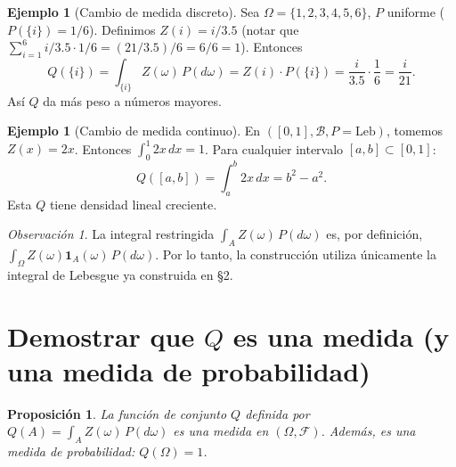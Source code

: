 \documentclass[11pt,a4paper]{article}
\theoremstyle{plain}
\newtheorem{proposition}[theorem]{Proposición}
\theoremstyle{definition}
\newtheorem{example}[theorem]{Ejemplo}
\theoremstyle{remark}
\newtheorem{remark}[theorem]{Observación}
\newcommand{\1}{\mathbf{1}}
\newcommand{\cF}{\mathcal{F}}
\begin{document}
\begin{example}[Cambio de medida discreto]
Sea $\Omega=\{1,2,3,4,5,6\}$, $P$ uniforme ($P(\{i\})=1/6$). Definimos $Z(i)=i/3.5$ (notar que $\sum_{i=1}^6 i/3.5 \cdot 1/6 = (21/3.5)/6 = 6/6=1$). Entonces
\[
Q(\{i\}) = \int_{\{i\}} Z(\omega)\,P(d\omega) = Z(i)\cdot P(\{i\}) = \frac{i}{3.5}\cdot\frac{1}{6} = \frac{i}{21}.
\]
Así $Q$ da más peso a números mayores.
\end{example}

\begin{example}[Cambio de medida continuo]
En $([0,1],\mathcal{B},P=\text{Leb})$, tomemos $Z(x)=2x$. Entonces $\int_0^1 2x\,dx=1$. Para cualquier intervalo $[a,b]\subset[0,1]$:
\[
Q([a,b]) = \int_a^b 2x\,dx = b^2-a^2.
\]
Esta $Q$ tiene densidad lineal creciente.
\end{example}

\begin{remark}
La integral restringida $\int_A Z(\omega)\,P(d\omega)$ es, por definición, $\int_\Omega Z(\omega)\1_A(\omega)\,P(d\omega)$. Por lo tanto, la construcción utiliza únicamente la integral de Lebesgue ya construida en \S2.
\end{remark}

\section{Demostrar que $Q$ es una medida (y una medida de probabilidad)}

\begin{proposition}
\label{prop:Qmeasure}
La función de conjunto $Q$ definida por $Q(A)=\int_A Z(\omega)\,P(d\omega)$ es una medida en $(\Omega,\cF)$. Además, es una medida de probabilidad: $Q(\Omega)=1$.
\end{proposition}
\end{document}
